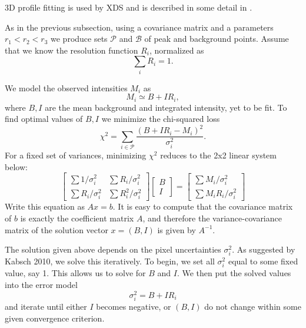 \documentclass[twocolumn,preprintnumbers,amsmath,amssymb]{revtex4}
\newcommand{\calP}{\mathcal{P}}
\newcommand{\calB}{\mathcal{B}}
\begin{document}
3D profile fitting is used by XDS \cite{Kab10a} and is described in some detail in \cite{Kab88,Kab10b}.

As in the previous subsection, using a covariance matrix and a parameters $r_1 < r_2 < r_3$ we produce sets $\calP$ and $\calB$ of peak and background points.
Assume that we know the resolution function $R_i$,
normalized as
\begin{equation}\label{Eresnor}
  \sum_i R_i = 1.
\end{equation}

We model the observed intensities $M_i$ as
\begin{equation} M_i \simeq B + I R_i, \end{equation}
where $B, I$ are the mean background and integrated intensity, yet to be fit. To find optimal values of $B,I$ we minimize the chi-squared loss
\begin{equation} \chi^2 = \sum_{i \in \calP} \frac{(B+IR_i - M_i)^2}{\sigma^2_i}. \end{equation}
For a fixed set of variances, minimizing $\chi^2$ reduces to the 2x2 linear system below:
\begin{equation} \begin{bmatrix}
  \sum 1/\sigma^2_i & \sum R_i / \sigma^2_i \\
  \sum R_i/\sigma_i^2 & \sum R_i^2 / \sigma^2_i
\end{bmatrix}
\begin{bmatrix} B \\ I \end{bmatrix}
 = \begin{bmatrix} \sum M_i/\sigma^2_i \\ \sum M_i R_i / \sigma^2_i \end{bmatrix} \end{equation}
 Write this equation as $Ax = b$. It is easy to compute that the covariance matrix of $b$ is exactly the coefficient matrix
 $A$, and therefore the variance-covariance matrix of the solution vector $x = (B, I)$ is given by $A^{-1}$.

The solution given above depends on the pixel uncertainties $\sigma_i^2$. As suggested by Kabsch 2010, we solve this iteratively. To begin, we set all $\sigma^2_i$ equal to some fixed value, say 1. This allows us to solve for $B$ and $I$. We then put the solved values into the error model
\begin{equation} \sigma_i^2 = B + I R_i \end{equation}
and iterate until either $I$ becomes negative, or $(B, I)$ do not change within some given convergence criterion.
\end{document}
